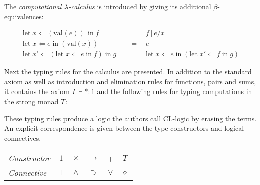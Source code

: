 \documentclass[12pt,toc=bibliography,numbers=noendperiod,
               footnotes=multiple,twoside]{scrartcl}
\begin{document}
The \emph{computational \(\lambda\)-calculus} is introduced by giving its additional \(\beta\)-equivalences:

\begin{align*}
\textrm{let}\; x \Leftarrow (\textrm{val}(e)) \,\;\textrm{in}\; f \quad &= \quad f[e/x] \\
\textrm{let}\; x \Leftarrow e \;\textrm{in}\; (\textrm{val}(x)) \quad &= \quad e \\
\textrm{let}\; x' \Leftarrow (\textrm{let}\; x \Leftarrow e \;\textrm{in}\; f) \;\textrm{in}\; g \quad &= \quad \textrm{let}\; x \Leftarrow e \;\textrm{in}\; (\textrm{let}\; x' \Leftarrow f \;\textrm{in}\; g)
\end{align*}

Next the typing rules for the calculus are presented. In addition to the standard axiom as well as introduction and elimination rules for functions, pairs and sums, it contains the axiom \(\Gamma \vdash * : 1\) and the following rules for typing computations in the strong monad \(T\):

\begin{figure}[h]
\begin{minipage}[b]{1\linewidth}
\centering
\begin{minipage}[b]{0.45\linewidth}
\begin{prooftree}
\end{prooftree}
\end{minipage}
\begin{minipage}[b]{0.35\linewidth}
\begin{prooftree}
\end{prooftree}
\end{minipage}
\end{minipage}
\end{figure}

These typing rules produce a logic the authors call CL-logic by erasing the terms. An explicit correspondence is given between the type constructors and logical connectives.

\begin{table}[h]
\centering
\begin{tabular}{l c c c c c}
\textit{Constructor} & \(1\) & \(\times\) & \(\rightarrow\) & + & \(T\) \\
\textit{Connective} & \(\top\) & \(\wedge\) & \(\supset\) & \(\vee\) & \(\diamond\)
\end{tabular}
\end{table}
\end{document}
